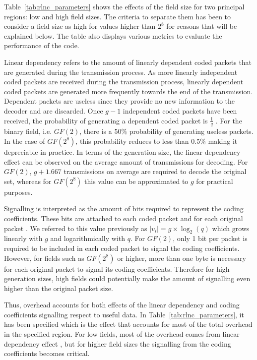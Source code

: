 Table~\ref{tab:rlnc_parameters} shows the effects of the field size for two principal regions: low and high field sizes. The criteria to separate them has been to consider a field size as high for values higher than $2^8$ for reasons that will be explained below. The table also displays various metrics to evaluate the performance of the code.

Linear dependency refers to the amount of linearly dependent coded packets that are generated during the transmission process. As more linearly independent coded packets are received during the transmission process, linearly dependent coded packets are generated more frequently towards the end of the transmission. Dependent packets are useless since they provide no new information to the decoder and are discarded. Once $g - 1$ independent coded packets have been received, the probability of generating a dependent coded packet is $\frac{1}{q}$ \cite{lucani2009random,trullols2011exact,zhao2012notes}. For the binary field, i.e. $GF(2)$, there is a 50\% probability of generating useless packets. In the case of $GF(2^8)$, this probability reduces to less than 0.5\% making it depreciable in practice. In terms of the generation size, the linear dependency effect can be observed on the average amount of transmissions for decoding. For $GF(2)$, $g + 1.667$ transmissions on average are required to decode the original set, whereas for $GF(2^8)$ this value can be approximated to $g$ for practical purposes. 

Signalling is interpreted as the amount of bits required to represent the coding coefficients. These bits are attached to each coded packet and for each original packet \cite{heide2011code}. We referred to this value previously as $|v_{i}| = g \times \log_{2}(q)$ which grows linearly with $g$ and logarithmically with $q$. For $GF(2)$, only 1 bit per packet is required to be included in each coded packet to signal the coding coefficients. However, for fields such as $GF(2^8)$ or higher, more than one byte is necessary for each original packet to signal its coding coefficients. Therefore for high generation sizes, high fields could potentially make the amount of signalling even higher than the original packet size.

Thus, overhead accounts for both effects of the linear dependency and coding coefficients signalling respect to useful data. In Table~\ref{tab:rlnc_parameters}, it has been specified which is the effect that accounts for most of the total overhead in the specified region. For low fields, most of the overhead comes from linear dependency effect , but for higher field sizes the signalling from the coding coefficients becomes critical. 

